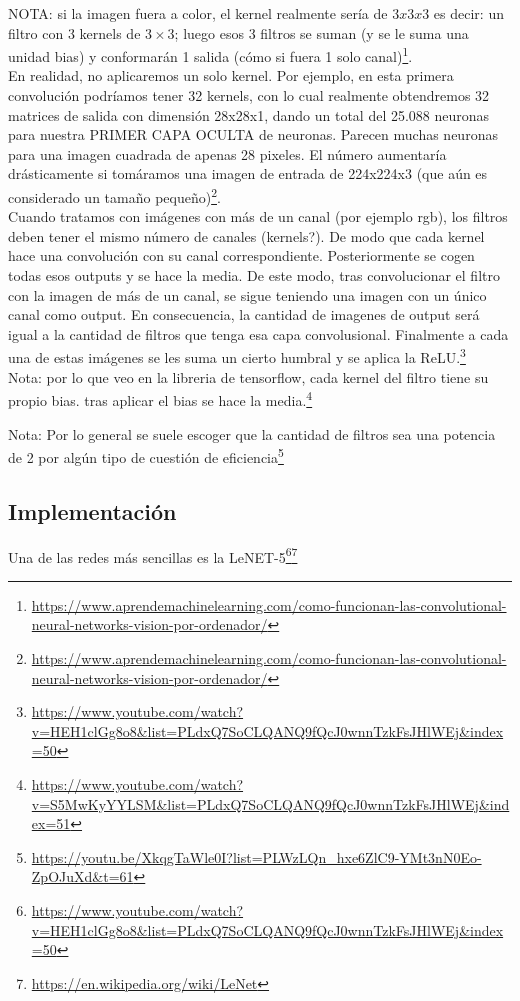 \documentclass{article}
\begin{document}
NOTA: si la imagen fuera a color, el kernel realmente sería de $3x3x3$ es decir: un filtro con 3 kernels de $3\times3$; luego  esos 3 filtros se suman (y se le suma una unidad bias) y conformarán 1 salida (cómo si fuera 1 solo canal)\footnote{\url{https://www.aprendemachinelearning.com/como-funcionan-las-convolutional-neural-networks-vision-por-ordenador/}}.\\

En realidad, no aplicaremos un solo kernel. Por ejemplo, en esta primera convolución podríamos tener 32 kernels, con lo cual realmente obtendremos 32 matrices de salida con dimensión 28x28x1, dando un total del 25.088 neuronas para nuestra PRIMER CAPA OCULTA de neuronas. Parecen muchas neuronas para una imagen cuadrada de apenas 28 pixeles. El número aumentaría drásticamente si tomáramos una imagen de entrada de 224x224x3 (que aún es considerado un tamaño pequeño)\footnote{\url{https://www.aprendemachinelearning.com/como-funcionan-las-convolutional-neural-networks-vision-por-ordenador/}}.\\

Cuando tratamos con imágenes con más de un canal (por ejemplo rgb), los filtros deben tener el  mismo número de canales (kernels?). De modo que cada kernel  hace una convolución con su canal correspondiente. Posteriormente se cogen todas esos outputs y se hace la media. De este modo, tras convolucionar el filtro con la imagen de más de un canal, se sigue teniendo una imagen con un único canal como output. En consecuencia, la cantidad de imagenes de output será igual a la cantidad de filtros que tenga esa capa convolusional. Finalmente a cada una de estas imágenes se les suma un cierto humbral y se aplica la ReLU.\footnote{\url{https://www.youtube.com/watch?v=HEH1clGg8o8&list=PLdxQ7SoCLQANQ9fQcJ0wnnTzkFsJHlWEj&index=50}}\\

Nota: por lo que veo en la libreria de tensorflow, cada kernel del filtro tiene su propio bias. tras aplicar el bias se hace la media.\footnote{\url{https://www.youtube.com/watch?v=S5MwKyYYLSM&list=PLdxQ7SoCLQANQ9fQcJ0wnnTzkFsJHlWEj&index=51}}

Nota: Por lo general se suele escoger que la cantidad de filtros sea una potencia de 2 por algún tipo de cuestión de eficiencia\footnote{\url{https://youtu.be/XkqgTaWle0I?list=PLWzLQn_hxe6ZlC9-YMt3nN0Eo-ZpOJuXd&t=61}}

\subsection{Implementación}
Una de las redes más sencillas es la LeNET-5\footnote{\url{https://www.youtube.com/watch?v=HEH1clGg8o8&list=PLdxQ7SoCLQANQ9fQcJ0wnnTzkFsJHlWEj&index=50}}\footnote{\url{https://en.wikipedia.org/wiki/LeNet}}\\
\end{document}
